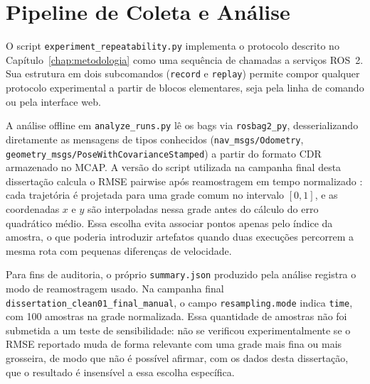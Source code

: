 \section{Pipeline de Coleta e Análise}
\label{sec:impl_pipeline}

O script \texttt{experiment\_\allowbreak repeatability.py} implementa o protocolo descrito no
Capítulo~\ref{chap:metodologia} como uma sequência de chamadas a serviços ROS~2.
Sua estrutura em dois subcomandos (\texttt{record} e \texttt{replay}) permite compor
qualquer protocolo experimental a partir de blocos elementares, seja pela linha de
comando ou pela interface web.

A análise offline em \texttt{analyze\_\allowbreak runs.py} lê os bags via \texttt{rosbag2\_\allowbreak py},
desserializando diretamente as mensagens de tipos conhecidos
(\texttt{nav\_\allowbreak msgs/\allowbreak Odometry}, \texttt{geometry\_\allowbreak msgs/\allowbreak PoseWithCovarianceStamped})
a partir do formato CDR armazenado no MCAP. A versão do script utilizada na
campanha final desta dissertação calcula o RMSE pairwise após reamostragem em
tempo normalizado \cite{amigoni2010}: cada trajetória é projetada para uma grade comum no intervalo
$[0,1]$, e as coordenadas $x$ e $y$ são interpoladas nessa grade antes do cálculo
do erro quadrático médio. Essa escolha evita associar pontos apenas pelo índice
da amostra, o que poderia introduzir artefatos quando duas execuções percorrem
a mesma rota com pequenas diferenças de velocidade.

Para fins de auditoria, o próprio \texttt{summary.json} produzido pela análise
registra o modo de reamostragem usado. Na campanha final
\texttt{dissertation\_\allowbreak clean01\_\allowbreak final\_\allowbreak manual}, o campo
\texttt{resampling.mode} indica \texttt{time}, com 100 amostras na grade
normalizada. Essa quantidade de amostras não foi submetida a um teste de
sensibilidade: não se verificou experimentalmente se o RMSE reportado muda
de forma relevante com uma grade mais fina ou mais grosseira, de modo que
não é possível afirmar, com os dados desta dissertação, que o resultado é
insensível a essa escolha específica.

